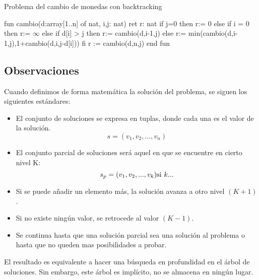 \begin{codebox}{Problema del cambio de monedas con backtracking}
\begin{pascallike}
fun cambio(d:array[1..n] of nat, i,j: nat) ret r: nat
    if j=0 then r:= 0
    else if i = 0 then r:= $\infty$
    else if d[i] > j then r:= cambio(d,i-1,j)
    else r:= min(cambio(d,i-1,j),1+cambio(d,i,j-d[i]))
    fi
    r := cambio(d,n,j)
end fun    
\end{pascallike}
\end{codebox}

\subsection{Observaciones}

Cuando definimos de forma matemática la solución del problema, se siguen los siguientes estándares:
\begin{itemize}
    \item El conjunto de soluciones se expresa en tuplas, donde cada una es el valor de la solución.
    $$
    s = (v_1, v_2, \ldots, v_n)
    $$
    \item El conjunto parcial de soluciones será aquel en que se encuentre en cierto nivel K:
    $$
    s_p = (v_1, v_2,...,v_k) \\ \text{si } k ...
    $$
    \item Si se puede añadir un elemento más, la solución avanza a otro nivel $(K+1)$.
    \item Si no existe ningún valor, se retrocede al valor $(K-1)$.
    \item Se continua hasta que una solución parcial sea una solución al problema o hasta que no queden mas posibilidades a probar.
\end{itemize}

El resultado es equivalente a hacer una búsqueda en profundidad en el árbol de soluciones. Sin embargo, este árbol es implícito, no se almacena en ningún lugar.